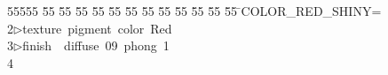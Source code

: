 %
%
\begin{tabbing}
55555 \= 55 \= 55 \= 55 \= 55 \= 55 \= 55 \= 55 \= 55 \= 55 \= 55 \= 55 \= 55 \= \>COLOR\_RED\_SHINY=\\[0pt]
2\>$\triangleright$\>texture\ pigment\ color\ Red\ \ \\[0pt]
3\>$\triangleright$\>finish\ \ diffuse\ 09\ phong\ 1\\[0pt]
4\>\end{tabbing}
